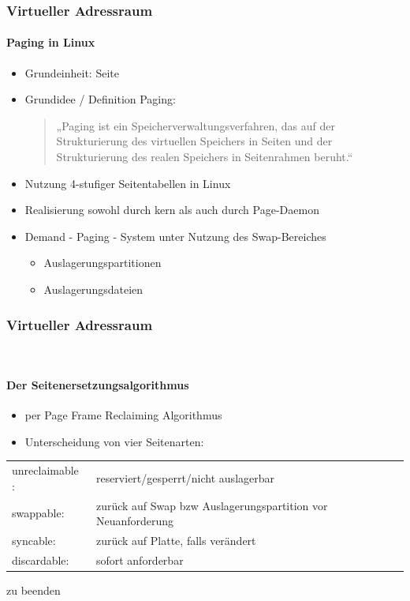 \documentclass[ddcfooter,nosectionnum]{tudbeamer}
\begin{document}
\begin{frame}
 
    \frametitle {Virtueller Adressraum}
    
    \framesubtitle {Paging in Linux}
    \begin{itemize}
         \item  Grundeinheit: Seite
         \item Grundidee / Definition Paging: \\
        \begin{quote}
         „Paging ist ein Speicherverwaltungsverfahren, das auf der Strukturierung  des virtuellen Speichers 	in Seiten und der Strukturierung des realen Speichers in Seitenrahmen beruht.“
     	 \end{quote}
 	 \item Nutzung 4-stufiger Seitentabellen in Linux
	 \item Realisierung sowohl durch kern als auch durch Page-Daemon
	 \item Demand - Paging - System unter Nutzung des Swap-Bereiches
	 \begin{itemize}
	 	\item Auslagerungspartitionen 
		\item Auslagerungsdateien
	\end{itemize}
    
    
     \end{itemize}
    
\end{frame}

\begin{frame}
	\frametitle{Virtueller Adressraum}\
	\framesubtitle {Der Seitenersetzungsalgorithmus}
 	\begin{itemize}
		\item per Page Frame Reclaiming Algorithmus
		\item Unterscheidung von vier Seitenarten:
	\end{itemize}	
		
		\begin{center}
		{\tiny
		\begin{tabular}{ l l }
 			 unreclaimable :&  reserviert/gesperrt/nicht auslagerbar \\
  			 swappable:       &  zurück auf Swap bzw Auslagerungspartition vor Neuanforderung\\
 			 syncable:		 &  zurück auf Platte, falls verändert\\
			 discardable:      & sofort anforderbar\\
		\end{tabular}
		}
		\end{center}
		
		zu beenden

			
    
\end{frame}
\end{document}
